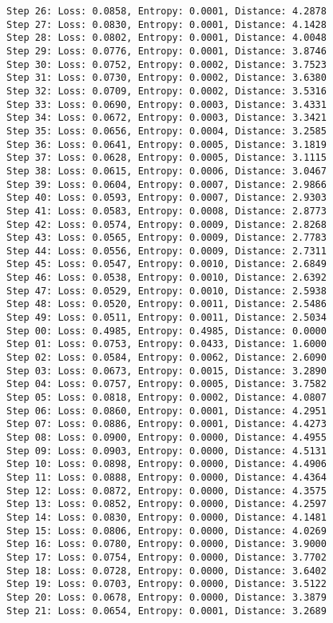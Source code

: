 \documentclass[11pt]{article}
\begin{document}
\begin{Verbatim}[commandchars=\\\{\}]
Step 26: Loss: 0.0858, Entropy: 0.0001, Distance: 4.2878
Step 27: Loss: 0.0830, Entropy: 0.0001, Distance: 4.1428
Step 28: Loss: 0.0802, Entropy: 0.0001, Distance: 4.0048
Step 29: Loss: 0.0776, Entropy: 0.0001, Distance: 3.8746
Step 30: Loss: 0.0752, Entropy: 0.0002, Distance: 3.7523
Step 31: Loss: 0.0730, Entropy: 0.0002, Distance: 3.6380
Step 32: Loss: 0.0709, Entropy: 0.0002, Distance: 3.5316
Step 33: Loss: 0.0690, Entropy: 0.0003, Distance: 3.4331
Step 34: Loss: 0.0672, Entropy: 0.0003, Distance: 3.3421
Step 35: Loss: 0.0656, Entropy: 0.0004, Distance: 3.2585
Step 36: Loss: 0.0641, Entropy: 0.0005, Distance: 3.1819
Step 37: Loss: 0.0628, Entropy: 0.0005, Distance: 3.1115
Step 38: Loss: 0.0615, Entropy: 0.0006, Distance: 3.0467
Step 39: Loss: 0.0604, Entropy: 0.0007, Distance: 2.9866
Step 40: Loss: 0.0593, Entropy: 0.0007, Distance: 2.9303
Step 41: Loss: 0.0583, Entropy: 0.0008, Distance: 2.8773
Step 42: Loss: 0.0574, Entropy: 0.0009, Distance: 2.8268
Step 43: Loss: 0.0565, Entropy: 0.0009, Distance: 2.7783
Step 44: Loss: 0.0556, Entropy: 0.0009, Distance: 2.7311
Step 45: Loss: 0.0547, Entropy: 0.0010, Distance: 2.6849
Step 46: Loss: 0.0538, Entropy: 0.0010, Distance: 2.6392
Step 47: Loss: 0.0529, Entropy: 0.0010, Distance: 2.5938
Step 48: Loss: 0.0520, Entropy: 0.0011, Distance: 2.5486
Step 49: Loss: 0.0511, Entropy: 0.0011, Distance: 2.5034
Step 00: Loss: 0.4985, Entropy: 0.4985, Distance: 0.0000
Step 01: Loss: 0.0753, Entropy: 0.0433, Distance: 1.6000
Step 02: Loss: 0.0584, Entropy: 0.0062, Distance: 2.6090
Step 03: Loss: 0.0673, Entropy: 0.0015, Distance: 3.2890
Step 04: Loss: 0.0757, Entropy: 0.0005, Distance: 3.7582
Step 05: Loss: 0.0818, Entropy: 0.0002, Distance: 4.0807
Step 06: Loss: 0.0860, Entropy: 0.0001, Distance: 4.2951
Step 07: Loss: 0.0886, Entropy: 0.0001, Distance: 4.4273
Step 08: Loss: 0.0900, Entropy: 0.0000, Distance: 4.4955
Step 09: Loss: 0.0903, Entropy: 0.0000, Distance: 4.5131
Step 10: Loss: 0.0898, Entropy: 0.0000, Distance: 4.4906
Step 11: Loss: 0.0888, Entropy: 0.0000, Distance: 4.4364
Step 12: Loss: 0.0872, Entropy: 0.0000, Distance: 4.3575
Step 13: Loss: 0.0852, Entropy: 0.0000, Distance: 4.2597
Step 14: Loss: 0.0830, Entropy: 0.0000, Distance: 4.1481
Step 15: Loss: 0.0806, Entropy: 0.0000, Distance: 4.0269
Step 16: Loss: 0.0780, Entropy: 0.0000, Distance: 3.9000
Step 17: Loss: 0.0754, Entropy: 0.0000, Distance: 3.7702
Step 18: Loss: 0.0728, Entropy: 0.0000, Distance: 3.6402
Step 19: Loss: 0.0703, Entropy: 0.0000, Distance: 3.5122
Step 20: Loss: 0.0678, Entropy: 0.0000, Distance: 3.3879
Step 21: Loss: 0.0654, Entropy: 0.0001, Distance: 3.2689

\end{Verbatim}
\end{document}
